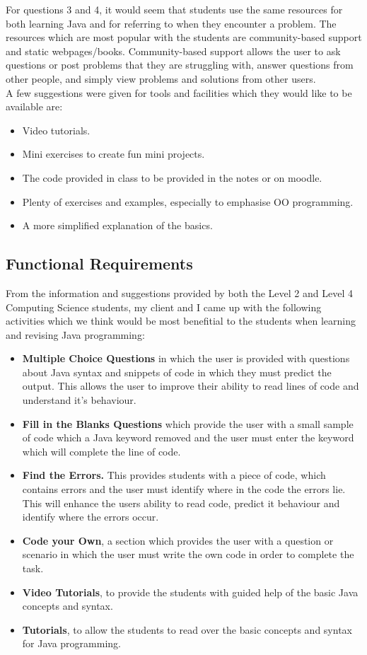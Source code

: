 \documentclass{article}
\begin{document}
For questions 3 and 4, it would seem that students use the same resources for both learning Java and for referring to when they encounter a problem. The resources which are most popular with the students are community-based support and static webpages/books. Community-based support allows the user to ask questions or post problems that they are struggling with, answer questions from other people, and simply view problems and solutions from other users.\\

A few suggestions were given for tools and facilities which they would like to be available are:

\begin{itemize}
\item Video tutorials.
\item Mini exercises to create fun mini projects.
\item The code provided in class to be provided in the notes or on moodle.
\item Plenty of exercises and examples, especially to emphasise OO programming.
\item A more simplified explanation of the basics.
\end{itemize}

\subsection{Functional Requirements}

From the information and suggestions provided by both the Level 2 and Level 4 Computing Science students, my client and I came up with the following activities which we think would be most benefitial to the students when learning and revising Java programming:

\begin{itemize}
\item \textbf{Multiple Choice Questions} in which the user is provided with questions about Java syntax and snippets of code in which they must predict the output. This allows the user to improve their ability to read lines of code and understand it's behaviour.
\item \textbf{Fill in the Blanks Questions} which provide the user with a small sample of code which a Java keyword removed and the user must enter the keyword which will complete the line of code.
\item \textbf{Find the Errors.} This provides students with a piece of code, which contains errors and the user must identify where in the code the errors lie. This will enhance the users ability to read code, predict it behaviour and identify where the errors occur.
\item \textbf{Code your Own}, a section which provides the user with a question or scenario in which the user must write the own code in order to complete the task.
\item \textbf{Video Tutorials}, to provide the students with guided help of the basic Java concepts and syntax.
\item \textbf{Tutorials}, to allow the students to read over the basic concepts and syntax for Java programming.
\end{itemize}
\end{document}
